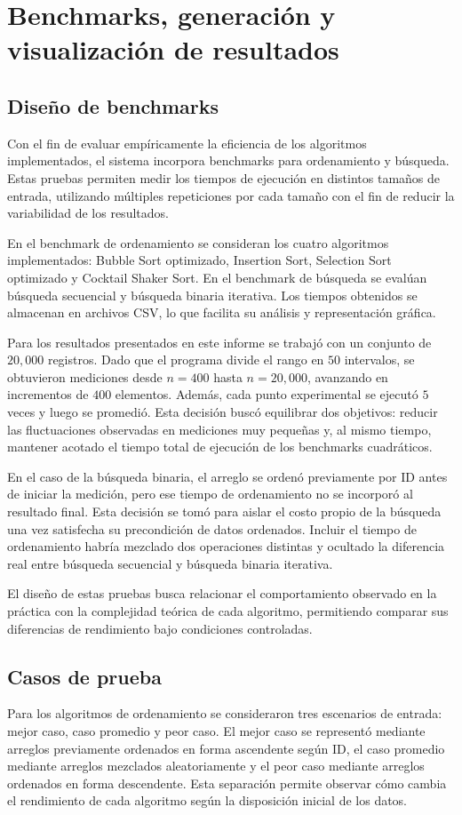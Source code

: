 \section{Benchmarks, generación y visualización de resultados}
\subsection{Diseño de benchmarks}
Con el fin de evaluar empíricamente la eficiencia de los algoritmos implementados, el sistema incorpora benchmarks para ordenamiento y búsqueda. Estas pruebas permiten medir los tiempos de ejecución en distintos tamaños de entrada, utilizando múltiples repeticiones por cada tamaño con el fin de reducir la variabilidad de los resultados.

En el benchmark de ordenamiento se consideran los cuatro algoritmos implementados: Bubble Sort optimizado, Insertion Sort, Selection Sort optimizado y Cocktail Shaker Sort. En el benchmark de búsqueda se evalúan búsqueda secuencial y búsqueda binaria iterativa. Los tiempos obtenidos se almacenan en archivos CSV, lo que facilita su análisis y representación gráfica.

Para los resultados presentados en este informe se trabajó con un conjunto de \(20{,}000\) registros. Dado que el programa divide el rango en \(50\) intervalos, se obtuvieron mediciones desde \(n=400\) hasta \(n=20{,}000\), avanzando en incrementos de \(400\) elementos. Además, cada punto experimental se ejecutó \(5\) veces y luego se promedió. Esta decisión buscó equilibrar dos objetivos: reducir las fluctuaciones observadas en mediciones muy pequeñas y, al mismo tiempo, mantener acotado el tiempo total de ejecución de los benchmarks cuadráticos.

En el caso de la búsqueda binaria, el arreglo se ordenó previamente por ID antes de iniciar la medición, pero ese tiempo de ordenamiento no se incorporó al resultado final. Esta decisión se tomó para aislar el costo propio de la búsqueda una vez satisfecha su precondición de datos ordenados. Incluir el tiempo de ordenamiento habría mezclado dos operaciones distintas y ocultado la diferencia real entre búsqueda secuencial y búsqueda binaria iterativa.

El diseño de estas pruebas busca relacionar el comportamiento observado en la práctica con la complejidad teórica de cada algoritmo, permitiendo comparar sus diferencias de rendimiento bajo condiciones controladas.

\subsection{Casos de prueba}
Para los algoritmos de ordenamiento se consideraron tres escenarios de entrada: mejor caso, caso promedio y peor caso. El mejor caso se representó mediante arreglos previamente ordenados en forma ascendente según ID, el caso promedio mediante arreglos mezclados aleatoriamente y el peor caso mediante arreglos ordenados en forma descendente. Esta separación permite observar cómo cambia el rendimiento de cada algoritmo según la disposición inicial de los datos.

